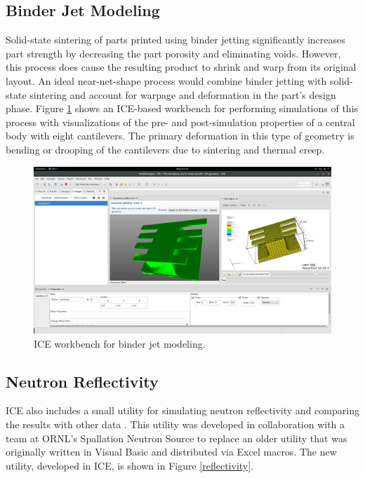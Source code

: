 \subsection{Binder Jet Modeling}\label{binder-jet-modeling}

Solid-state sintering of parts printed using binder jetting
significantly increases part strength by decreasing the part porosity
and eliminating voids. However, this process does cause the resulting
product to shrink and warp from its original layout. An ideal near-net-shape 
process would combine binder jetting with solid-state sintering and account
for warpage and deformation in the part's design phase. 
Figure \ref{binder} shows an ICE-based workbench for performing simulations of
this process with visualizations of the pre- and post-simulation
properties of a central body with eight cantilevers. The primary
deformation in this type of geometry is bending or drooping of the
cantilevers due to sintering and thermal creep.

\begin{figure}[H]
\centering
\includegraphics[width=\textwidth]{images/ice-bjm.png}
\caption{ICE workbench for binder jet modeling.}
\label{binder}
\end{figure}

\subsection{Neutron Reflectivity}\label{neutron-reflectivity}

ICE also includes a small utility for simulating neutron reflectivity and
comparing the results with other data \cite{billings_brand_2015}. This 
utility was developed in collaboration with a team at ORNL's Spallation Neutron 
Source to replace an older utility that was originally written in Visual Basic and distributed via Excel macros. The new utility, developed in ICE, is shown in Figure \ref{reflectivity}.

